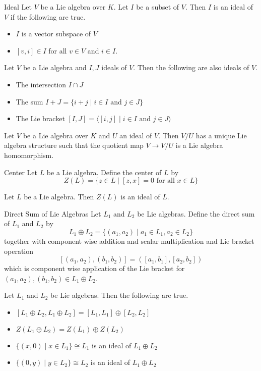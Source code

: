 \documentclass[a4paper]{article}
\begin{document}
\begin{defn}{Ideal}{} Let $V$ be a Lie algebra over $K$. Let $I$ be a subset of $V$. Then $I$ is an ideal of $V$ if the following are true. 
\begin{itemize}
\item $I$ is a vector subspace of $V$
\item $[v,i]\in I$ for all $v\in V$ and $i\in I$. 
\end{itemize}
\end{defn}

\begin{prp}{}{} Let $V$ be a Lie algebra and $I,J$ ideals of $V$. Then the following are also ideals of $V$. 
\begin{itemize}
\item The intersection $I\cap J$
\item The sum $I+J=\{i+j\;|\;i\in I\text{ and }j\in J\}$
\item The Lie bracket $[I,J]=\langle[i,j]\;|\;i\in I\text{ and }j\in J\rangle$
\end{itemize}
\end{prp}

\begin{prp}{}{} Let $V$ be a Lie algebra over $K$ and $U$ an ideal of $V$. Then $V/U$ has a unique Lie algebra structure such that the quotient map $V\to V/U$ is a Lie algebra homomorphism. 
\end{prp}

\begin{defn}{Center}{} Let $L$ be a Lie algebra. Define the center of $L$ by $$Z(L)=\{z\in L\;|\;[z,x]=0\text{ for all }x\in L\}$$
\end{defn}

\begin{lmm}{}{} Let $L$ be a Lie algebra. Then $Z(L)$ is an ideal of $L$. 
\end{lmm}

\begin{defn}{Direct Sum of Lie Algebras}{} Let $L_1$ and $L_2$ be Lie algebras. Define the direct sum of $L_1$ and $L_2$ by $$L_1\oplus L_2=\{(a_1,a_2)\;|\;a_1\in L_1,a_2\in L_2\}$$ together with component wise addition and scalar multiplication and Lie bracket operation $$[(a_1,a_2),(b_1,b_2)]=([a_1,b_1],[a_2,b_2])$$ which is component wise application of the Lie bracket for $(a_1,a_2),(b_1,b_2)\in L_1\oplus L_2$. 
\end{defn}

\begin{prp}{}{} Let $L_1$ and $L_2$ be Lie algebras. Then the following are true. 
\begin{itemize}
\item $[L_1\oplus L_2,L_1\oplus L_2]=[L_1,L_1]\oplus[L_2,L_2]$
\item $Z(L_1\oplus L_2)=Z(L_1)\oplus Z(L_2)$
\item $\{(x,0)\;|\;x\in L_1\}\cong L_1$ is an ideal of $L_1\oplus L_2$
\item $\{(0,y)\;|\;y\in L_2\}\cong L_2$ is an ideal of $L_1\oplus L_2$
\end{itemize}
\end{prp}
\end{document}
